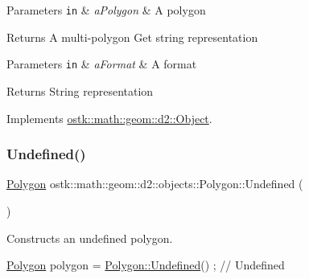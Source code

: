 \begin{DoxyParams}[1]{Parameters}
\mbox{\tt in}  & {\em a\+Polygon} & A polygon \\
\hline
\end{DoxyParams}
\begin{DoxyReturn}{Returns}
A multi-\/polygon Get string representation
\end{DoxyReturn}

\begin{DoxyParams}[1]{Parameters}
\mbox{\tt in}  & {\em a\+Format} & A format \\
\hline
\end{DoxyParams}
\begin{DoxyReturn}{Returns}
String representation 
\end{DoxyReturn}


Implements \hyperlink{classostk_1_1math_1_1geom_1_1d2_1_1_object_ada4c2187dd24ef02b91b6346191f677c}{ostk\+::math\+::geom\+::d2\+::\+Object}.

\mbox{\label{classostk_1_1math_1_1geom_1_1d2_1_1objects_1_1_polygon_af260e109c9315fd31f7f24f3154dcbf2}} 
\subsubsection{\texorpdfstring{Undefined()}{Undefined()}}
{\footnotesize\ttfamily \hyperlink{classostk_1_1math_1_1geom_1_1d2_1_1objects_1_1_polygon}{Polygon} ostk\+::math\+::geom\+::d2\+::objects\+::\+Polygon\+::\+Undefined (\begin{DoxyParamCaption}{ }\end{DoxyParamCaption})\hspace{0.3cm}{\ttfamily [static]}}



Constructs an undefined polygon. 


\begin{DoxyCode}
\hyperlink{classostk_1_1math_1_1geom_1_1d2_1_1objects_1_1_polygon_adaf9ef564754ab10ed3dd0d5fa0d90ea}{Polygon} polygon = \hyperlink{classostk_1_1math_1_1geom_1_1d2_1_1objects_1_1_polygon_af260e109c9315fd31f7f24f3154dcbf2}{Polygon::Undefined}() ; \textcolor{comment}{// Undefined}
\end{DoxyCode}


